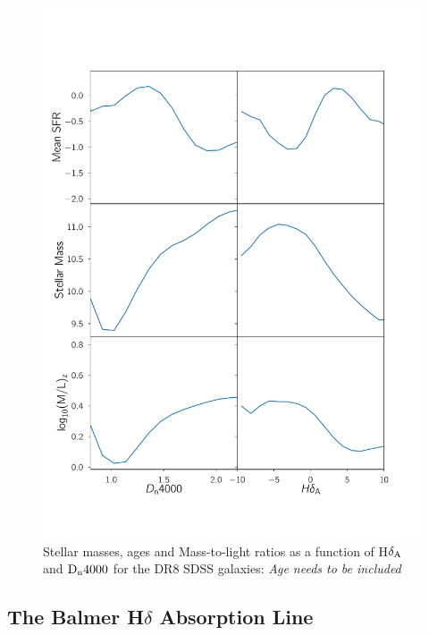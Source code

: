 \begin{figure}
\includegraphics[width=\textwidth]{figures/mass_age_sfr_dist.pdf}
\caption[SFR's, stellar masses, ages and Mass-to-light ratios as a function of H$\delta_{\rm A}$ and ${\rm D}_{\rm n}4000$ for the DR8 SDSS galaxies ]
{Stellar masses, ages and Mass-to-light ratios as a function of H$\delta_{\rm A}$ and ${\rm D}_{\rm n}4000$ for the DR8 SDSS galaxies: \emph{Age needs to be included}
\label{fig:sfr_mass}}
\end{figure}


\subsection{The Balmer H$\delta$ Absorption Line}
\label{hdelta}

